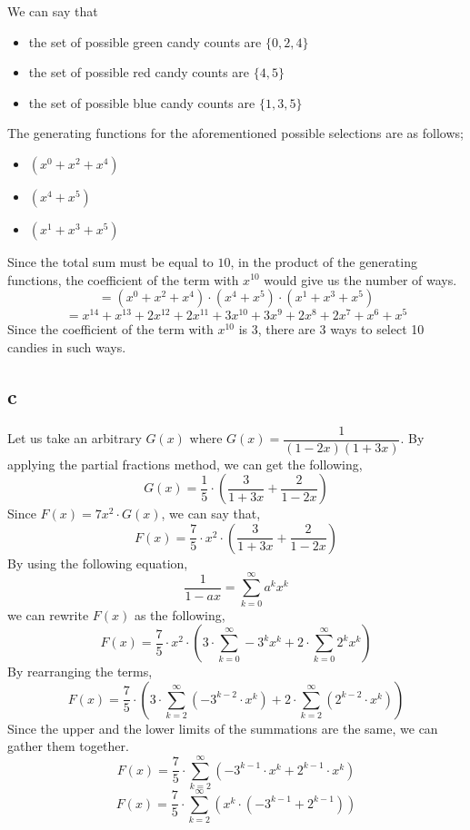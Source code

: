 \documentclass[12pt]{article}
\begin{document}
We can say that 
\begin{itemize}
    \item the set of possible green candy counts are $\{ 0, 2, 4 \} $
    \item the set of possible red candy counts are $\{ 4, 5 \} $
    \item the set of possible blue candy counts are $\{ 1, 3, 5 \} $
\end{itemize}
The generating functions for the aforementioned possible selections are as follows;
\begin{itemize}
    \item $(x^0 + x^2 + x^4)$ 
    \item $(x^4 + x^5)$
    \item $(x^1 + x^3 + x^5)$
\end{itemize}
Since the total sum must be equal to $10$, in the product of the generating functions, the coefficient of the term with $x^{10}$ would give us the number of ways.
$$ = (x^0 + x^2 + x^4) \cdot (x^4 + x^5) \cdot (x^1 + x^3 + x^5) $$
$$ = x^{14} + x^{13} + 2x^{12} + 2x^{11} +
3x^{10} + 3x^{9} + 2x^{8} + 2x^{7} + x^6 + x^5  $$
Since the coefficient of the term with $x^{10}$ is 3, there are 3 ways to select 10 candies in such ways.

\subsection*{c}
Let us take an arbitrary $G(x)$ where $G(x) = \dfrac{1}{(1-2x)(1+3x)}$. By applying the partial fractions method, we can get the following,
$$ G(x) = \dfrac{1}{5} \cdot \left( \dfrac{3}{1+3x}+\dfrac{2}{1-2x} \right)$$ 
Since $F(x) = 7x^2 \cdot G(x)$, we can say that,
$$ F(x) = \dfrac{7}{5} \cdot x^2 \cdot \left( \dfrac{3}{1+3x}+\dfrac{2}{1-2x} \right)$$ 
By using the following equation, 
$$ \dfrac{1}{1-ax} = \sum\limits_{k=0}^{\infty} a^k x^k $$ 
we can rewrite $F(x)$ as the following,
$$ F(x) = \dfrac{7}{5} \cdot x^2 \cdot \left( 3 \cdot \sum\limits_{k=0}^{\infty} -3^k x^k + 2 \cdot \sum\limits_{k=0}^{\infty} 2^k x^k \right) $$ 
By rearranging the terms,
$$ F(x) = \dfrac{7}{5} \cdot \left( 3 \cdot \sum\limits_{k=2}^{\infty} (-3^{k-2} \cdot x^{k}) + 2 \cdot \sum\limits_{k=2}^{\infty} (2^{k-2} \cdot x^{k} ) \right) $$ 
Since the upper and the lower limits of the summations are the same, we can gather them together.
$$ F(x) = \dfrac{7}{5} \cdot  \sum\limits_{k=2}^{\infty} ( -3^{k-1} \cdot x^{k} + 2^{k-1} \cdot x^{k} ) $$
$$ F(x) = \dfrac{7}{5} \cdot  \sum\limits_{k=2}^{\infty} \left( x^{k} \cdot (-3^{k-1} + 2^{k-1}) \right) $$
\end{document}
